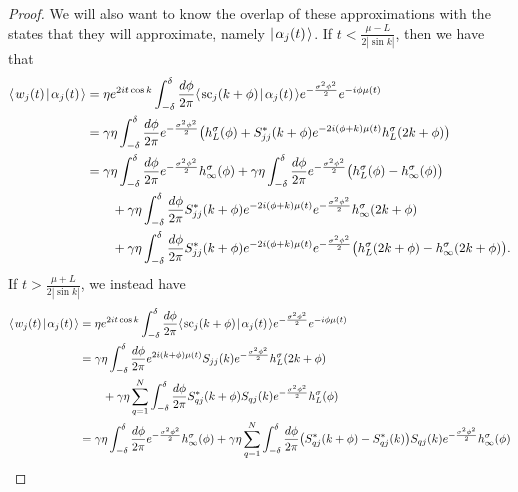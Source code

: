 \documentclass[../thesis-main/thesis-main]{subfiles}
\begin{document}
\begin{proof}
\begin{comment}
\end{comment}

We will also want to know the overlap of these approximations with the states that they will approximate, namely $|\mspace{2mu} \alpha_j(t) \mspace{2mu} \rangle$.  If $t < \frac{\mu - L}{2|\sin k|}$, then we have that
\begin{align}
  \langle\mspace{2mu} w_j(t) \mspace{2mu} | \mspace{2mu} \alpha_j(t)\mspace{2mu} \rangle &= \eta e^{2 i t \cos k} \int_{-\delta}^\delta \frac{d\phi}{2\pi} \langle\mspace{2mu} \text{sc}_j(k+\phi) \mspace{2mu} | \mspace{2mu} \alpha_j(t)\mspace{2mu} \rangle  e^{-\frac{\sigma^2\phi^2}{2}} e^{ - i \phi \mu(t)}\\
  &= \gamma \eta \int_{-\delta}^\delta \frac{d\phi}{ 2\pi} e^{-\frac{\sigma^2\phi^2}{2}} \big( h_L^\sigma(\phi) + S_{jj}^*(k+\phi) e^{-2 i (\phi + k) \mu(t)}h_L^\sigma(2k+\phi) \big)\\
  &= \gamma \eta \int_{-\delta}^\delta \frac{d\phi}{2\pi} e^{-\frac{\sigma^2\phi^2}{2}} h_\infty^\sigma(\phi) +\gamma \eta\int_{-\delta}^\delta \frac{d\phi}{2\pi}e^{-\frac{\sigma^2\phi^2}{2}}  \big( h_L^\sigma(\phi) - h_\infty^\sigma(\phi)\big) \nonumber \\
  & \qquad + \gamma \eta \int_{-\delta}^\delta \frac{d\phi}{2\pi} S_{jj}^*(k+\phi) e^{-2 i (\phi + k)\mu(t)}e^{-\frac{\sigma^2\phi^2}{2}}  h_\infty^\sigma(2k + \phi)  \nonumber\\
  &\qquad + \gamma \eta \int_{-\delta}^\delta \frac{d\phi}{2\pi} S_{jj}^*(k+\phi) e^{-2 i (\phi + k)\mu(t)}e^{-\frac{\sigma^2\phi^2}{2}}  \big(h_L^\sigma(2k+\phi) - h_\infty^\sigma(2k + \phi) \big).
\end{align}
If $t > \frac{\mu + L}{2|\sin k|}$, we instead have 
\begin{align}
  \braket{w_j(t)}{\alpha_j(t)} &= \eta e^{2 i t \cos k} \int_{-\delta}^\delta \frac{d\phi}{2\pi} \braket{\scat_j(k+\phi)}{\alpha_j(t)} e^{-\frac{\sigma^2\phi^2}{2}} e^{ - i \phi \mu(t)}\\
    &= \gamma\eta \int_{-\delta}^\delta \frac{d\phi}{2\pi} e^{2 i (k+\phi)\mu(t)} S_{jj}(k) e^{-\frac{\sigma^2\phi^2}{2}} h_{L}^\sigma(2k+\phi)\nonumber\\
    &\qquad +\gamma\eta \sum_{q=1}^N \int_{-\delta}^\delta \frac{d\phi}{2\pi}  S_{qj}^*(k+\phi) S_{qj}(k)e^{-\frac{\sigma^2\phi^2}{2}}  h_L^\sigma(\phi)\\
    &= \gamma \eta \int_{-\delta}^\delta \frac{d\phi}{2\pi} e^{-\frac{\sigma^2\phi^2}{2}} h_\infty^\sigma(\phi)
      + \gamma \eta\sum_{q=1}^N \int_{-\delta}^\delta \frac{d\phi}{2\pi} \big(S_{qj}^*(k+\phi )- S_{qj}^*(k)\big) S_{qj}(k)e^{-\frac{\sigma^2\phi^2}{2}} h_{\infty}^\sigma(\phi)\nonumber\\

\end{align}
\end{proof}
\end{document}
